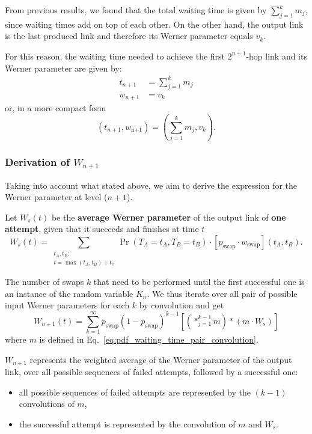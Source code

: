 \documentclass{masterthesis}
\begin{document}
From previous results, we found that the total waiting time is given by $\sum_{j=1}^{k} m_{j}$, since waiting times add on top of each other. On the other hand, the output link is the last produced link and therefore its Werner parameter equals $v_{k}$. 

For this reason, the waiting time needed to achieve the first $2^{n+1}$-hop link and its Werner parameter are given by:
\begin{align}
    t_{n+1} &= \sum_{j=1}^{k} m_{j} \\ 
    w_{n+1} &= v_k 
\end{align}
or, in a more compact form
\begin{equation}
    \left(t_{n+1}, w_\text{n+1}\right) = \left(\sum_{j=1}^{k} m_{j}, v_{k}\right) .
\end{equation}

\subsubsection*{Derivation of $W_{n+1}$}

Taking into account what stated above, we aim to derive the expression for the Werner parameter at level ($n+1$). %

Let $W_{s}(t)$ be the \textbf{average Werner parameter} of the output link of \textbf{one attempt}, given that it succeeds and finishes at time $t$
\begin{equation}
    W_s(t) = \sum_{\substack{t_A, t_B:\\ t = \max(t_A, t_B) + t_c}} \Pr(T_A = t_A, T_B = t_B) \cdot [p_\text{swap} \cdot w_\text{swap}](t_A, t_B) .
\end{equation}

The number of swaps $k$ that need to be performed until the first successful one is an instance of the random variable $K_{n}$.
We thus iterate over all pair of possible input Werner parameters for each $k$ by convolution and get
\begin{equation}\label{eq:werner_parameter_swap}
    W_{n+1}(t) = \sum_{k=1}^{\infty} p_\text{swap} {(1 - p_\text{swap})}^{k-1} \left[ \left( \ast_{j=1}^{k-1} m \right) \ast \left( m \cdot W_{s} \right) \right]
\end{equation}
where $m$ is defined in Eq.~\ref{eq:pdf_waiting_time_pair_convolution}.

$W_{n+1}$ represents the weighted average of the Werner parameter of the output link, over all possible sequences of failed attempts, followed by a successful one:
\begin{itemize}
    \item all possible sequences of failed attempts are represented by the $(k-1)$ convolutions of $m$,
    \item the successful attempt is represented by the convolution of $m$ and $W_{s}$.
\end{itemize}
\end{document}
